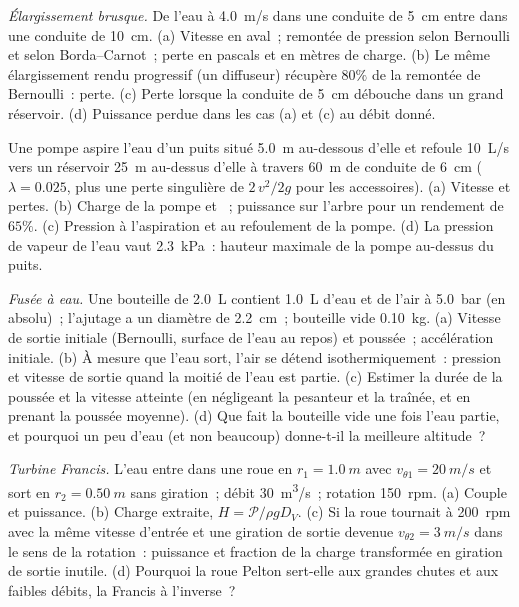 \begin{exercise}[$\star\star$]\label{exo:b2:flow-balances:8}
\emph{Élargissement brusque.} De l'eau à \qty{4.0}{m/s} dans une conduite de \qty{5}{cm} entre
dans une conduite de \qty{10}{cm}. (a) Vitesse en aval~; remontée de pression selon
Bernoulli et selon Borda--Carnot~; perte en pascals et en mètres
de charge. (b) Le même élargissement rendu progressif (un diffuseur) récupère $80\%$
de la remontée de Bernoulli~: perte. (c) Perte lorsque la conduite de \qty{5}{cm} débouche
dans un grand réservoir. (d) Puissance perdue dans les cas (a) et (c) au débit donné.
\end{exercise}

\begin{exercise}[$\star\star$]\label{exo:b2:flow-balances:9}
Une pompe aspire l'eau d'un puits situé \qty{5.0}{m} au-dessous d'elle et refoule
\qty{10}{L/s} vers un réservoir \qty{25}{m} au-dessus d'elle à travers \qty{60}{m} de conduite de \qty{6}{cm}
($\lambda = 0.025$, plus une perte singulière de $2\,v^2/2g$ pour les accessoires).
(a) Vitesse et pertes. (b) Charge de la pompe et ~; puissance sur l'arbre
pour un rendement de $65\%$. (c) Pression à l'aspiration et au
refoulement de la pompe. (d) La pression de vapeur de l'eau vaut \qty{2.3}{kPa}~: hauteur maximale
de la pompe au-dessus du puits.
\end{exercise}

\begin{exercise}[$\star\star\star$]\label{exo:b2:flow-balances:10}
\emph{Fusée à eau.} Une bouteille de \qty{2.0}{L} contient \qty{1.0}{L} d'eau et de
l'air à \qty{5.0}{bar} (en absolu)~; l'ajutage a un diamètre de \qty{2.2}{cm}~;
bouteille vide \qty{0.10}{kg}. (a) Vitesse de sortie initiale (Bernoulli, surface de
l'eau au repos) et poussée~; accélération initiale. (b) À mesure que l'eau sort,
l'air se détend isothermiquement~: pression et vitesse de sortie quand la moitié de
l'eau est partie. (c) Estimer la durée de la poussée et la vitesse atteinte
(en négligeant la pesanteur et la traînée, et en prenant la poussée moyenne). (d)
Que fait la bouteille vide une fois l'eau partie, et pourquoi un peu
d'eau (et non beaucoup) donne-t-il la meilleure altitude~?
\end{exercise}

\begin{exercise}[$\star\star\star$]\label{exo:b2:flow-balances:11}
\emph{Turbine Francis.} L'eau entre dans une roue en $r_1 = \qty{1.0}{m}$ avec
$v_{\theta1} = \qty{20}{m/s}$ et sort en $r_2 = \qty{0.50}{m}$ sans giration~;
débit \qty{30}{m^3/s}~; rotation \qty{150}{rpm}. (a) Couple et puissance. (b)
Charge extraite, $H = \mathcal P/\rho gD_V$. (c) Si la roue tournait à
\qty{200}{rpm} avec la même vitesse d'entrée et une giration de sortie devenue
$v_{\theta2} = \qty{3}{m/s}$ dans le sens de la rotation~: puissance et
fraction de la charge transformée en giration de sortie inutile. (d) Pourquoi la
roue Pelton sert-elle aux grandes chutes et aux faibles débits, la Francis à
l'inverse~?
\end{exercise}

